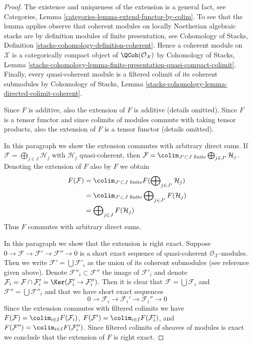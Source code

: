 \begin{proof}
The existence and uniqueness of the extension is a general fact, see
Categories, Lemma \ref{categories-lemma-extend-functor-by-colim}.
To see that the lemma applies observe that coherent modules on
locally Noetherian algebraic stacks are by definition modules
of finite presentation, see
Cohomology of Stacks, Definition \ref{stacks-cohomology-definition-coherent}.
Hence a coherent module on $\mathcal{X}$ is a
categorically compact object of $\QCoh(\mathcal{O}_\mathcal{X})$ by
Cohomology of Stacks, Lemma
\ref{stacks-cohomology-lemma-finite-presentation-quasi-compact-colimit}.
Finally, every quasi-coherent module is a filtered colimit of
its coherent submodules by Cohomology of Stacks, Lemma
\ref{stacks-cohomology-lemma-directed-colimit-coherent}.

\medskip\noindent
Since $F$ is additive, also the extension of $F$ is additive (details omitted).
Since $F$ is a tensor functor and since colimits of modules
commute with taking tensor products, also the extension of $F$
is a tensor functor (details omitted).

\medskip\noindent
In this paragraph we show the extension commutes with arbitrary
direct sums. If $\mathcal{F} = \bigoplus_{j \in J} \mathcal{H}_j$
with $\mathcal{H}_j$ quasi-coherent, then
$\mathcal{F} = \colim_{J' \subset J\text{ finite}}
\bigoplus_{j \in J'} \mathcal{H}_j$.
Denoting the extension of $F$ also by $F$ we obtain
\begin{align*}
F(\mathcal{F})
& =
\colim_{J' \subset J\text{ finite}}
F(\bigoplus\nolimits_{j \in J'} \mathcal{H}_j) \\
& =
\colim_{J' \subset J\text{ finite}}
\bigoplus\nolimits_{j \in J'} F(\mathcal{H}_j) \\
& =
\bigoplus\nolimits_{j \in J} F(\mathcal{H}_j)
\end{align*}
Thus $F$ commutes with arbitrary direct sums.

\medskip\noindent
In this paragraph we show that the extension is right exact.
Suppose $0 \to \mathcal{F} \to \mathcal{F}' \to \mathcal{F}'' \to 0$
is a short exact sequence of quasi-coherent $\mathcal{O}_\mathcal{X}$-modules.
Then we write $\mathcal{F}' = \bigcup \mathcal{F}'_i$ as the
union of its coherent submodules (see reference given above).
Denote $\mathcal{F}''_i \subset \mathcal{F}''$ the image of $\mathcal{F}'_i$
and denote $\mathcal{F}_i = \mathcal{F} \cap \mathcal{F}'_i =
\Ker(\mathcal{F}'_i \to \mathcal{F}''_i)$. Then it is clear that
$\mathcal{F} = \bigcup \mathcal{F}_i$ and
$\mathcal{F}'' = \bigcup \mathcal{F}''_i$
and that we have short exact sequences
$$
0 \to \mathcal{F}_i \to \mathcal{F}_i' \to \mathcal{F}_i'' \to 0
$$
Since the extension commutes with filtered colimits we have
$F(\mathcal{F}) = \colim_{i \in I} F(\mathcal{F}_i)$,
$F(\mathcal{F}') = \colim_{i \in I} F(\mathcal{F}'_i)$, and
$F(\mathcal{F}'') = \colim_{i \in I} F(\mathcal{F}''_i)$.
Since filtered colimits of sheaves of modules is exact we
conclude that the extension of $F$ is right exact.


\end{proof}
